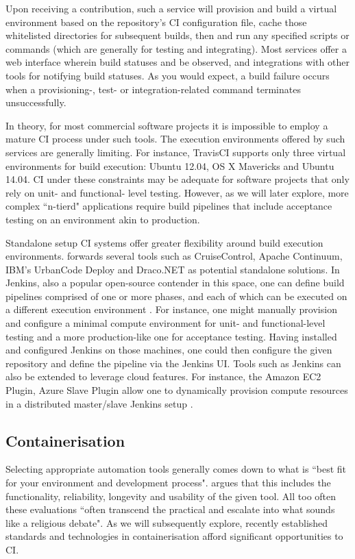 \documentclass{report}
\begin{document}
\par
Upon receiving a contribution, such a service will provision
and build a virtual environment based on the repository's CI configuration
file, cache those whitelisted directories for subsequent builds, then and run any
specified scripts or commands (which are generally for testing and integrating).
Most services offer a web interface wherein build statuses and be observed, and 
integrations with other tools for notifying build statuses. As you would expect,
a build failure occurs when a provisioning-, test- or integration-related command
terminates unsuccessfully. 
\par
In theory, for most commercial software projects it is impossible to
employ a mature CI process under such tools. The execution environments offered by such services are generally limiting. 
For instance, TravisCI supports  only three virtual environments for build execution: Ubuntu 12.04,
OS X Mavericks and Ubuntu 14.04. CI under these constraints may be
adequate for software projects that only rely on unit- and functional- level
testing. However, as we will later explore, more complex ``n-tierd" applications require build pipelines that 
include acceptance testing on an environment akin to production. 
\par
Standalone setup CI systems offer greater flexibility around build 
execution environments. \citet{Duvall} forwards several tools such
as CruiseControl, Apache Continuum, IBM's UrbanCode Deploy and Draco.NET 
as potential standalone solutions. In Jenkins, also a popular open-source contender in this space, 
one can define build pipelines comprised of one or more phases, and each of which can be executed on a different  
execution environment \citep{Smart}. For instance, one might manually provision and configure a 
minimal compute environment for unit- and functional-level testing and a more production-like 
one for acceptance testing. Having installed and configured Jenkins on those machines, one could then
configure the given repository and define the pipeline via the Jenkins UI.
Tools such as Jenkins can also be extended to leverage cloud features. For instance,
the Amazon EC2 Plugin, Azure Slave Plugin allow one to dynamically
provision compute resources in a distributed master/slave Jenkins setup \citep{Smart}.

\subsection{Containerisation}
Selecting appropriate automation tools
generally comes down to what is ``best fit for your
environment and development process". \citet{Duvall}
argues that this includes the functionality, reliability, longevity and 
usability of the given tool. All too often these
evaluations ``often transcend the practical and 
escalate into what sounds like a religious debate". 
As we will subsequently explore, recently established 
standards and technologies in containerisation 
afford significant opportunities to CI.
\end{document}

